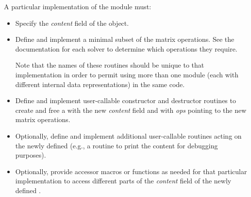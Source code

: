 A particular implementation of the {\sunmatrix} module must:
\begin{itemize}
\item Specify the {\em content} field of the  object.
\item Define and implement a minimal subset of the matrix operations.
  See the documentation for each {\sundials} solver to determine which
  {\sunmatrix} operations they require.

  Note that the names of these routines should be unique to that
  implementation in order to permit using more than one {\sunmatrix}
  module (each with different  internal data
  representations) in the same code.
\item Define and implement user-callable constructor and destructor
  routines to create and free a  with
  the new {\em content} field and with {\em ops} pointing to the
  new matrix operations.
\item Optionally, define and implement additional user-callable routines
  acting on the newly defined  (e.g., a routine to print
  the content for debugging purposes).
\item Optionally, provide accessor macros or functions as needed for
  that particular implementation to access different parts
  of the {\em content} field of the newly defined .
\end{itemize}
